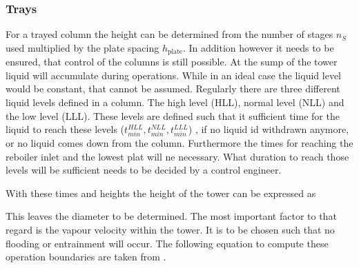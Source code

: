     \subsubsection{Trays}
        For a trayed column the height can be determined from the number of stages $n_S$ used multiplied by
        the plate spacing $h_{\text{plate}}$. In addition however it needs to be ensured, that control of the
        columns is still possible. At the sump of the tower liquid will accumulate during operations.
        While in an ideal case the liquid level would be constant, that cannot be assumed. Regularly
        there are three different liquid levels defined in a column. The high level (HLL), normal
        level (NLL) and the low level (LLL). These levels are defined such that it sufficient time
        for the liquid to reach these levels ($t_{min}^{HLL}, t_{min}^{NLL}, t_{min}^{LLL}$) ,
        if no liquid id withdrawn anymore, or no liquid comes down from the column. Furthermore
        the times for reaching the reboiler inlet and the lowest plat will ne necessary.
        What duration to reach those levels will be sufficient needs to be decided by a control engineer.

        With these times and heights the height of the tower can be expressed as

        This leaves the diameter to be determined. The most important factor to that regard is the vapour velocity
        within the tower. It is to be chosen such that no flooding or entrainment will occur. The following equation
        to compute these operation boundaries are taken from \cite{Lygeros.1986}.


